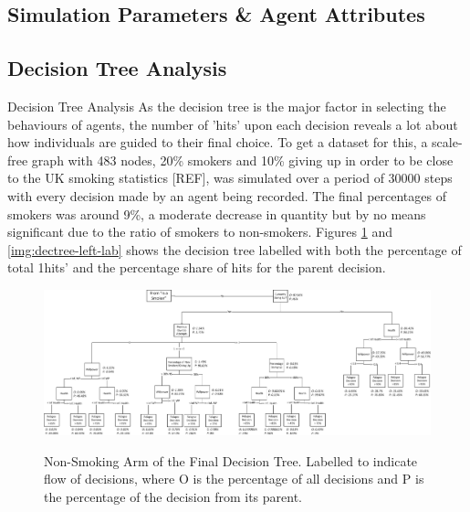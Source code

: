 \documentclass[]{report}
\begin{document}
\subsection{Simulation Parameters \& Agent Attributes}






\subsection{Decision Tree Analysis}
Decision Tree Analysis
As the decision tree is the major factor in selecting the behaviours of agents, the number of 'hits' upon each decision reveals a lot about how individuals are guided to their final choice. To get a dataset for this, a scale-free graph with 483 nodes, 20\% smokers and 10\% giving up in order to be close to the UK smoking statistics [REF], was simulated over a period of 30000 steps with every decision made by an agent being recorded. The final percentages of smokers was around 9\%, a moderate decrease in quantity but by no means significant due to the ratio of smokers to non-smokers. Figures \ref{img:dectree-right-lab} and \ref{img:dectree-left-lab}  shows the decision tree labelled with both the percentage of total 1hits' and the percentage share of hits for the parent decision.

\begin{landscape}
\begin{figure}
\begin{center}
\includegraphics[width=\paperwidth,keepaspectratio]{dectree-right-labelled.png}
\label{img:dectree-right-lab}
\caption{Non-Smoking Arm of the Final Decision Tree. Labelled to indicate flow of decisions, where O is the percentage of all decisions and P is the percentage of the decision from its parent.}
\end{center}
\end{figure}
\end{landscape}
\end{document}
